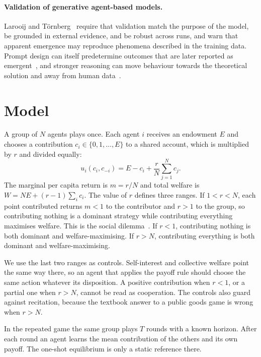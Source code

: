 \documentclass[runningheads]{llncs}
\begin{document}
\paragraph{Validation of generative agent-based models.}
Larooij and T\"ornberg~\cite{larooij2026validation} require that validation match the purpose of the model, be grounded in external evidence, and be robust across runs, and warn that apparent emergence may reproduce phenomena described in the training data. Prompt design can itself predetermine outcomes that are later reported as emergent~\cite{liwu2025letitgo}, and stronger reasoning can move behaviour towards the theoretical solution and away from human data~\cite{kitadai2025reasoning}.

\section{Model}

A group of $N$ agents plays once. Each agent $i$ receives an endowment $E$ and chooses a contribution $c_i \in \{0,1,\dots,E\}$ to a shared account, which is multiplied by $r$ and divided equally:
\begin{equation}
u_i(c_i, c_{-i}) = E - c_i + \frac{r}{N}\sum_{j=1}^{N} c_j .
\label{eq:payoff}
\end{equation}
The marginal per capita return is $m = r/N$ and total welfare is $W = NE + (r-1)\sum_i c_i$. The value of $r$ defines three ranges. If $1<r<N$, each point contributed returns $m<1$ to the contributor and $r>1$ to the group, so contributing nothing is a dominant strategy while contributing everything maximises welfare. This is the social dilemma~\cite{ledyard1995public}. If $r<1$, contributing nothing is both dominant and welfare-maximising. If $r>N$, contributing everything is both dominant and welfare-maximising.

We use the last two ranges as controls. Self-interest and collective welfare point the same way there, so an agent that applies the payoff rule should choose the same action whatever its disposition. A positive contribution when $r<1$, or a partial one when $r>N$, cannot be read as cooperation. The controls also guard against recitation, because the textbook answer to a public goods game is wrong when $r>N$.

In the repeated game the same group plays $T$ rounds with a known horizon. After each round an agent learns the mean contribution of the others and its own payoff. The one-shot equilibrium is only a static reference there.
\end{document}
